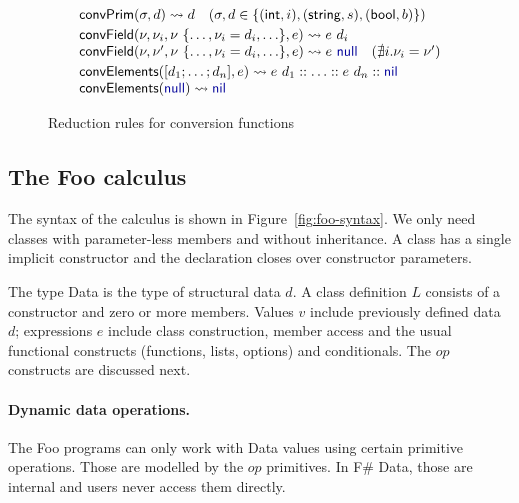 \documentclass[10pt,preprint,blind,clearpagebib]{sigplanconf}
\newcommand{\kvd}[1]{\textnormal{\textcolor{kvdclr}{\sffamily #1}}}
\newcommand{\ident}[1]{\textnormal{\sffamily #1}}
\newcommand{\reduce}{\rightsquigarrow}
\begin{document}
\begin{figure}
\begin{equation*}
\begin{array}{l}
\ident{convPrim}(\sigma, d) \reduce d\quad(\sigma,d\in\{ (\ident{int},i),(\ident{string},s),(\ident{bool}, b) \})
\\[0.25em]
\ident{convField}(\nu,\nu_i, \nu~\{\ldots, \nu_i=d_i, \ldots\}, e) \reduce e~d_i\\
\ident{convField}(\nu,\nu', \nu~\{\ldots, \nu_i=d_i, \ldots\}, e) \reduce e~\kvd{null}\quad(\nexists i.\nu_i=\nu' )
\\[0.25em]
\ident{convElements}([d_1; \ldots; d_n], e) \reduce e~d_1 :: \ldots :: e~d_n :: \kvd{nil}  \\  
\ident{convElements}(\kvd{null}) \reduce \kvd{nil}
\end{array}
\end{equation*}

\caption{Reduction rules for conversion functions}
\label{fig:op-conversions}
\vspace{-0.5em}
\end{figure}


\subsection{The Foo calculus}
\label{sec:formal-ff}

The syntax of the calculus is shown in Figure~\ref{fig:foo-syntax}. We only need classes with 
parameter-less members and without inheritance. A class has a single implicit constructor and the 
declaration closes over constructor parameters. 

The type \ident{Data} is the type of structural data $d$. A class definition $L$ consists of 
a constructor and zero or more members. Values $v$ include previously defined data $d$; expressions
$e$ include class construction, member access and the usual functional constructs (functions,
lists, options) and conditionals. The $op$ constructs are discussed next.


\paragraph{Dynamic data operations.}

The Foo programs can only work with \ident{Data} values using certain primitive operations. Those are modelled
by the $op$ primitives. In F\# Data, those are internal and users never access them directly.
\end{document}
